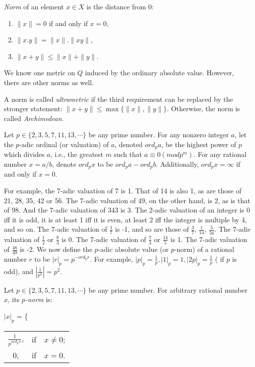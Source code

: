 \documentclass{llncs}
\begin{document}
{\em Norm} of an element $x \in X$ is the distance from $0$:
\begin{enumerate}
\item $\parallel x \parallel = 0$ if and only if $x = 0$,\\
\item $\parallel x.y \parallel = \parallel x \parallel . \parallel xy \parallel $,\\
\item $\parallel x+y \parallel  \leq \parallel x \parallel  + \parallel y \parallel $.
\end{enumerate}

We know one metric on $Q$  induced by the ordinary absolute value. However, there are other norms as well.

A norm  is called {\em ultrametric}  if the third requirement can be replaced by the stronger statement:
$\parallel x+y \parallel  \leq \max \{\parallel x \parallel  , \parallel y \parallel \}$.
Otherwise, the norm is called {\em Archimedean}.

\begin{definition}
Let $p \in \{2,3,5,7,11,13,\cdots \}$ be any prime number. For any nonzero integer $a$, let the $p$-adic ordinal (or valuation) of $a$, denoted $ord_p a$, be the highest power of $p$ which divides $a$, i.e., the greatest $m$ such that $a \equiv 0 (mod p^{m})$. For any rational number $x = a/b$, denote $ord_p x$ to be $ord_p a - ord_p b$. Additionally, $ord_p x = \infty $ if and only if $x = 0$.
\end{definition}

For example, the 7-adic valuation of 7 is 1. That of 14 is also 1, as are those of 21, 28, 35, 42 or 56. The 7-adic valuation of 49, on the other hand, is 2, as is that of 98. And the 7-adic valuation of 343 is 3. The 2-adic valuation of an integer is 0 iff it is odd, it is at least 1 iff it is even, at least 2 iff the integer is multiple by 4, and so on. The 7-adic valuation of $\frac{1}{7}$ is -1, and so are those of $\frac{3}{7}$, $\frac{1}{14}$, $\frac{5}{56}$. The 7-adic valuation of $\frac{1}{2}$ or $\frac{8}{3}$ is 0. The 7-adic valuation of $\frac{7}{3}$ or $\frac{14}{5}$ is 1. The 7-adic valuation of $\frac{48}{49}$ is -2.
We now define the $p$-adic absolute value (or $p$-norm) of a rational number $r$ to be $|r|_p = p^{-ord_p r}$. For example, $|p|_p = \frac{1}{p} , |1|_p = 1, |2p|_p = \frac{1}{p}$ ( if $p$ is odd), and $|\frac{1}{p^2}| = p^2$.

\begin{definition}
Let $p \in \{2,3,5,7,11,13,\cdots \}$ be any prime number. For arbitrary rational number $x$, its {\em $p$-norm} is:
\begin{center}
$|x|_p$ = \{
            \begin{tabular}{ccc}
            $\frac{1}{p^{ord_p x}}$, &  if  & $x \neq 0$;\\
            0,        &   if  & $x = 0$.\\
            \end{tabular}
\end{center}
\end{definition}
\end{document}

